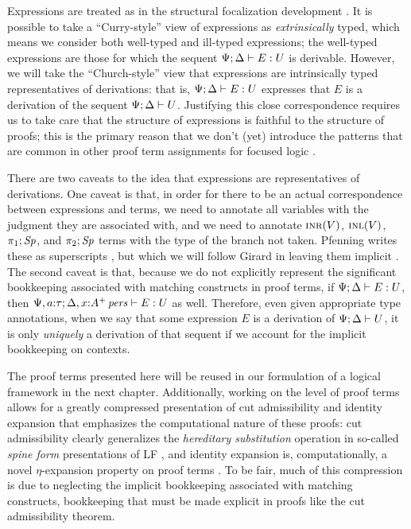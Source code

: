 Expressions are treated as in the structural focalization development
\cite{simmons11structural}. It is possible to take a ``Curry-style''
view of expressions as {\it extrinsically} typed, which means we
consider both well-typed and ill-typed expressions; the well-typed
expressions are those for which the sequent
${\Psi}; {\Delta} \vdash {E} : {U}$ is derivable. However, we will take the
``Church-style'' view that expressions are intrinsically typed
representatives of derivations: that is, ${\Psi}; {\Delta} \vdash {E} : {U}$
expresses that $E$ is a derivation of the sequent
${\Psi};{\Delta} \vdash {U}$. Justifying this close correspondence requires
us to take care that the structure of expressions is faithful to the
structure of proofs; this is the primary reason that we don't (yet)
introduce the patterns that are common in other proof term assignments
for focused logic
\cite{watkins02concurrent,licata08focusing,krishnaswami09focusing}.

There are two caveats to the idea that expressions are representatives
of derivations. One caveat is that, in order for there to be an actual
correspondence between expressions and terms, we need to annotate all
variables with the judgment they are associated with, and we need to
annotate $\textsc{inr}({V})$, $\textsc{inl}({V})$, $\pi_1;{{\it Sp}}$, and $\pi_2;{{\it Sp}}$
terms with the type of the branch not taken. Pfenning writes these as
superscripts \cite{pfenning08church}, but which we will follow Girard
in leaving them implicit \cite{girard89proofs}. The second caveat is
that, because we do not explicitly represent the significant
bookkeeping associated with matching constructs in proof terms, if
${\Psi}; {\Delta} \vdash {E} : {U}$, then ${\Psi, a{:}\tau}; {\Delta,
  x{:}{A^+}\,{{\it pers}}} \vdash {E} : {U}$ as well. Therefore, even given appropriate
type annotations, when we say that some expression $E$ is a derivation
of ${\Psi};{\Delta} \vdash {U}$, it is only {\it uniquely} a derivation of
that sequent if we account for the implicit bookkeeping on contexts.

The proof terms presented here will be reused in our formulation of a
logical framework in the next chapter.  Additionally, working on the
level of proof terms allows for a greatly compressed presentation of
cut admissibility and identity expansion that emphasizes the
computational nature of these proofs: cut admissibility clearly
generalizes the {\it hereditary substitution} operation in so-called {\it
  spine form} presentations of LF \cite{cervesato02linear}, and
identity expansion is, computationally, a novel $\eta$-expansion
property on proof terms \cite{simmons11structural}.  To be fair, much
of this compression is due to neglecting the implicit bookkeeping
associated with matching constructs, bookkeeping that must be made
explicit in proofs like the cut admissibility theorem.

